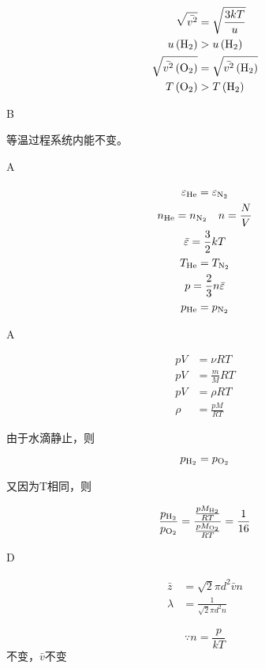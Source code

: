 \documentclass[b5paper,opensource]{./template/qyxf-book}
\begin{document}
\solve

$$
\begin{aligned} \sqrt {\bar{v^{2}}} &=\sqrt{\frac{3kT}{u}} \\
u\left(\ce{H2}\right)& > u\left(\ce{H2}\right) \\
\sqrt {\bar{v^{2}}\left(\ce{O2}\right)}& = \sqrt {\bar{v^{2}}\left(\ce{H2}\right) }\\
T\left(\ce{O2}\right)&>T\left(\ce{H2}\right) 
\end{aligned}
$$

B

\solve 等温过程系统内能不变。

A

\solve

\begin{gather*}
\varepsilon_{\ce{He}}=\varepsilon_{\ce{N2}}\\
n_{\ce{He}}=n_{\ce{N2}}\quad n=\frac{N}{V}\\
\bar{\varepsilon}=\frac{3}{2}kT\\
T_{\ce{He}}=T_{\ce{N2}}\\
p=\frac{2}{3}n\bar{\varepsilon}\\
p_{\ce{He}}=p_{\ce{N2}}
\end{gather*}

A

\solve

$$
\begin{aligned} 
p V & = \nu R T \\ p V & = \frac { m } { M } R T \\
p V & = \rho R T \\
\rho & = \frac { p M } { R T }
\end{aligned}
$$

由于水滴静止，则
$$
p_{\ce{H2}} =p_{\ce{O2}}
$$

又因为T相同，则

$$
\frac { p _ {\ce{H2}} } { p _ {\ce{O2}} } = \frac { \frac { p M _ {\ce{H2}} } { R T } } { \frac { p M_{\ce{O2}}}{ R T}}=\frac{1}{16}
$$

D

\solve

$$
\begin{aligned} \bar { z } & = \sqrt { 2 } \pi d ^ { 2 } \bar { v } n \\ \lambda & = \frac { 1 } { \sqrt { 2 } \pi d ^ { 2 } n } \end{aligned}
$$

$$
\because n = \frac { p } { k T }
$$不变，$ \bar { v }$不变
\end{document}
